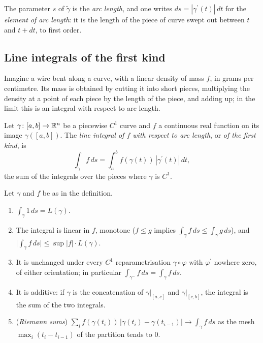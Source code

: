 The parameter $s$ of $\tilde\gamma$ is the \emph{arc length}, and one writes $ds = |\gamma^{\prime}(t)|\,dt$ for the \emph{element of arc length}: it is the length of the piece of curve swept out between $t$ and
$t + dt$, to first order.

\subsection{Line integrals of the first kind}\label{real-analysis:subsection-first-kind}

Imagine a wire bent along a curve, with a linear density of mass $f$, in grams per centimetre. Its mass is obtained by cutting it into short pieces, multiplying the density at a point of each piece by the
length of the piece, and adding up; in the limit this is an integral with respect to arc length.

\begin{definition}\label{real-analysis:definition-first-kind}
Let $\gamma \colon [a, b] \to \mathbb{R}^n$ be a piecewise $C^1$ curve and $f$ a continuous real function on its image $\gamma([a, b])$. The \emph{line integral of $f$ with respect to arc length}, or \emph{of the
first kind}, is
\[
\int_\gamma f\,ds = \int_a^bf(\gamma(t))\,|\gamma^{\prime}(t)|\,dt,
\]
the sum of the integrals over the pieces where $\gamma$ is $C^1$.
\end{definition}

\begin{proposition}\label{real-analysis:proposition-first-kind}
Let $\gamma$ and $f$ be as in the definition.
\begin{enumerate}
\item $\int_\gamma1\,ds = L(\gamma)$.
\item The integral is linear in $f$, monotone ($f \leq g$ implies $\int_\gamma f\,ds \leq \int_\gamma g\,ds$), and $\bigl|\int_\gamma f\,ds\bigr| \leq \sup|f|\cdot L(\gamma)$.
\item It is unchanged under every $C^1$ reparametrisation $\gamma \circ \varphi$ with $\varphi^{\prime}$ nowhere zero, of either orientation; in particular $\int_{\gamma^-}f\,ds = \int_\gamma f\,ds$.
\item It is additive: if $\gamma$ is the concatenation of $\gamma|_{[a, c]}$ and $\gamma|_{[c, b]}$, the integral is the sum of the two integrals.
\item (\emph{Riemann sums}) $\sum_if(\gamma(t_i))\,|\gamma(t_i) - \gamma(t_{i-1})| \to \int_\gamma f\,ds$ as the mesh $\max_i(t_i - t_{i-1})$ of the partition tends to $0$.
\end{enumerate}
\end{proposition}

